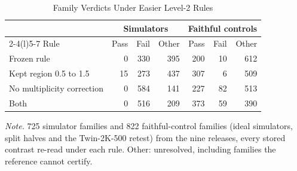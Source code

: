 \begin{table}[!ht]
\centering
\caption{Family Verdicts Under Easier Level-2 Rules}
\label{tab:s8leniency}
\footnotesize
\begin{tabular}{@{}lrrrrrr@{}}
\toprule
 & \multicolumn{3}{c}{Simulators} & \multicolumn{3}{c}{Faithful controls} \\
\cmidrule(lr){2-4}\cmidrule(l){5-7}
Rule & Pass & Fail & Other & Pass & Fail & Other \\
\midrule
Frozen rule & 0 & 330 & 395 & 200 & 10 & 612 \\
Kept region 0.5 to 1.5 & 15 & 273 & 437 & 307 & 6 & 509 \\
No multiplicity correction & 0 & 584 & 141 & 227 & 82 & 513 \\
Both & 0 & 516 & 209 & 373 & 59 & 390 \\
\bottomrule
\end{tabular}
\vspace{4pt}
\begin{tabnote}
\textit{Note.} 725 simulator families and 822 faithful-control families (ideal simulators, split halves and the Twin-2K-500 retest) from the nine releases, every stored contrast re-read under each rule. Other: unresolved, including families the reference cannot certify.
\end{tabnote}
\end{table}

